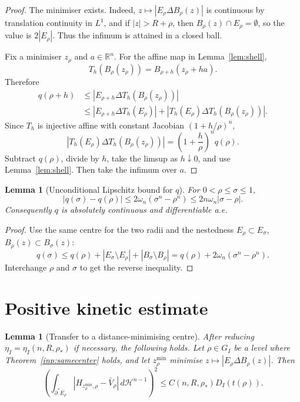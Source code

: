 \documentclass[11pt]{amsart}
\newtheorem{lemma}[theorem]{Lemma}
\theoremstyle{definition}
\newcommand{\R}{\mathbb R}
\newcommand{\rstar}{\rho_*}
\newcommand{\Hn}{\mathcal H^{n-1}}
\begin{document}
\begin{proof}
The minimiser exists.  Indeed, \(z\mapsto |E_\rho\Delta B_\rho(z)|\) is
continuous by translation continuity in \(L^1\), and if
\(|z|>R+\rho\), then \(B_\rho(z)\cap E_\rho=\emptyset\), so the value is
\(2|E_\rho|\).  Thus the infimum is attained in a closed ball.

Fix a minimiser \(z_\rho\) and \(a\in\R^n\).  For the affine map in
Lemma~\ref{lem:shell},
\[
   T_h(B_\rho(z_\rho))=B_{\rho+h}(z_\rho+ha).
\]
Therefore
\[
\begin{aligned}
   q(\rho+h)
   &\le |E_{\rho+h}\Delta T_h(B_\rho(z_\rho))|\\
   &\le |E_{\rho+h}\Delta T_h(E_\rho)|
      +|T_h(E_\rho)\Delta T_h(B_\rho(z_\rho))|.
\end{aligned}
\]
Since \(T_h\) is injective affine with constant Jacobian
\((1+h/\rho)^n\),
\[
   |T_h(E_\rho)\Delta T_h(B_\rho(z_\rho))|
   =
   \left(1+\frac h\rho\right)^n q(\rho).
\]
Subtract \(q(\rho)\), divide by \(h\), take the limsup as \(h\downarrow0\),
and use Lemma~\ref{lem:shell}.  Then take the infimum over \(a\).
\end{proof}

\begin{lemma}[Unconditional Lipschitz bound for \(q\)]\label{lem:qLip}
For \(0<\rho\le\sigma\le1\),
\[
   |q(\sigma)-q(\rho)|
   \le 2\omega_n(\sigma^n-\rho^n)
   \le 2n\omega_n|\sigma-\rho|.
\]
Consequently \(q\) is absolutely continuous and differentiable a.e.
\end{lemma}

\begin{proof}
Use the same centre for the two radii and the nestedness
\(E_\rho\subset E_\sigma\), \(B_\rho(z)\subset B_\sigma(z)\):
\[
   q(\sigma)\le q(\rho)+|E_\sigma\setminus E_\rho|
                         +|B_\sigma\setminus B_\rho|
   =q(\rho)+2\omega_n(\sigma^n-\rho^n).
\]
Interchange \(\rho\) and \(\sigma\) to get the reverse inequality.
\end{proof}

\section{Positive kinetic estimate}\label{sec:kinetic}

\begin{lemma}[Transfer to a distance-minimising centre]\label{lem:center-transfer}
After reducing \(\eta_I=\eta_I(n,R,\rstar)\) if necessary, the following
holds.  Let \(\rho\in G_I\) be a level where
Theorem~\ref{inp:samecenter} holds, and let \(z_\rho^{\min}\) minimise
\(z\mapsto |E_\rho\Delta B_\rho(z)|\).  Then
\begin{equation}\label{eq:H-DI-min}
   \left(
   \int_{\partial^*E_\rho}
      |H_{z_\rho^{\min},\rho}-\bar V_\rho|\,d\Hn
   \right)^2
   \le C(n,R,\rstar)D_I(t(\rho)).
\end{equation}
\end{lemma}
\end{document}
